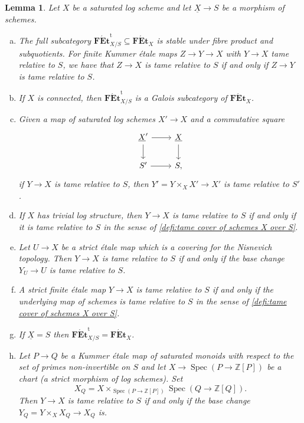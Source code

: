 \documentclass[a4paper,twoside,11pt,reqno]{amsart}
\renewcommand{\mathbb}{\mathds}
\newcommand{\bZ}{{\mathbb Z}}
\DeclareMathOperator{\Spec}{Spec}
\newcommand{\cat}[1]{\mathbf{#1}}
\newcommand{\FEt}{\cat{F\acute{E}t}}
\newcommand{\FEtt}{{\cat{F\acute{E}t}}^{\!\mathrm{t}}}
\newtheorem{lem}[thm]{Lemma}
\theoremstyle{definition}
\numberwithin{equation}{subsection}
\begin{document}
\begin{lem} \label{lem:tame-log-properties}
    Let $X$ be a saturated log scheme and let $\underline{X}\to S$ be a morphism of schemes. 
    \begin{enumerate}[(a)]
        \item \label{lemitem:tame-log-properties-basic} The full subcategory $\FEtt_{X/S}\subseteq \FEt_X$ is stable under fibre product and subquotients. For finite Kummer \'etale maps $Z\to Y\to X$ with $Y\to X$ tame relative to $S$, we have that $Z\to X$ is tame relative to $S$ if and only if $Z\to Y$ is tame relative to $S$.
        \item \label{lemitem:tame-log-properties-Galois} If $X$ is connected, then $\FEtt_{X/S}$ is a Galois subcategory of $\FEt_X$.
        \item \label{lemitem:tame-log-properties-bc} Given a map of saturated log schemes $X'\to X$ and a commutative square 
        \begin{equation} \label{eqn:tame-log-properties-bc-square}
            \begin{tikzcd}
                \underline{X}'\ar[r] \ar[d] & \underline{X} \ar[d] \\
                S' \ar[r] & S,
            \end{tikzcd}
        \end{equation}
        if $Y\to X$ is tame relative to $S$, then $Y'=Y\times_X X'\to X'$ is tame relative to $S'$. 
        \item \label{lemitem:tame-log-properties-no-log-str} If $X$ has trivial log structure, then $Y\to X$ is tame relative to $S$ if and only if it is tame relative to $S$ in the sense of \cref{defi:tame cover of schemes X over S}.
        \item \label{lemitem:tame-log-properties-tame-local} Let $U\to X$ be a strict \'etale map which is a covering for the Nisnevich topology.
        Then $Y\to X$ is tame relative to $S$ if and only if the base change $Y_U\to U$ is tame relative to $S$.
        \item \label{lemitem:tame-log-properties-strict} A strict finite \'etale map $Y\to X$ is tame relative to $S$ if and only if the underlying map of schemes is tame relative to $S$ in the sense of \cref{defi:tame cover of schemes X over S}. 
        \item \label{lemitem:tame-log-properties-XequalsS} If $\underline{X}=S$ then $\FEtt_{X/S} = \FEt_X$.
        \item \label{lemitem:tame-log-properties-XQ} Let $P\to Q$ be a Kummer \'etale map of saturated monoids with respect to the set of primes non-invertible on $S$ and let $X\to \Spec(P\to \bZ[P])$ be a chart (a strict morphism of log schemes). Set
        \[
            X_Q =  X\times_{\Spec(P\to\bZ[P])} \Spec(Q\to\bZ[Q]) .
        \]
        Then $Y\to X$ is tame relative to $S$ if and only if the base change $Y_Q=Y\times_X X_Q\to X_Q$ is. 
    \end{enumerate}
\end{lem}
\end{document}
